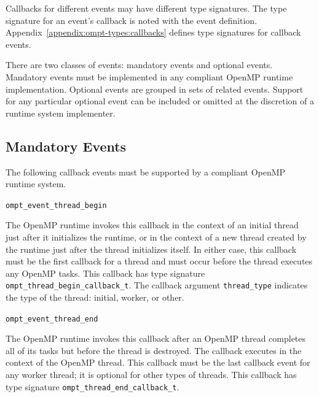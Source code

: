 \documentclass{article}
\newcommand{\descheader}[1]{{\needspace{3\baselineskip}\vspace{1em}\noindent \fbox{#1}}}
\begin{document}
Callbacks for different events may have different type signatures. 
The type signature for an event's callback is noted with the event definition.  Appendix~\ref{appendix:ompt-types:callbacks} defines type signatures for callback events.


There are two classes of events: mandatory events and optional events.
Mandatory events must be implemented in any compliant OpenMP runtime implementation. 
Optional events are grouped in sets of related events. Support for any particular optional event can be included or omitted at the 
discretion of a runtime system implementer. 




\subsection{Mandatory Events}
\label{sec:mandatory-events}

 The following callback events must be supported by a compliant OpenMP 
 runtime system. 

\descheader{Threads}

\begin{description}

\item \verb|ompt_event_thread_begin|

The OpenMP runtime invokes this callback in the context of an initial thread just after it initializes the runtime, or in the context of a new thread created by the runtime just after the thread initializes itself. In either case, this callback must be the first callback for a thread
and must occur before the thread executes any OpenMP tasks. This callback has type signature \verb|ompt_thread_begin_callback_t|. 
The callback argument \verb|thread_type| indicates the type of the thread: initial, worker, or other.


\item \verb|ompt_event_thread_end|

The OpenMP runtime invokes this callback
after an OpenMP thread completes all of
its tasks but before the thread is destroyed. The callback
executes in the context of the OpenMP thread. This callback must be the last callback event for any worker thread; it is optional for other types of threads.
This callback has type signature \verb|ompt_thread_end_callback_t|. 

\end{description}

\descheader{Parallel Regions}
\end{document}
